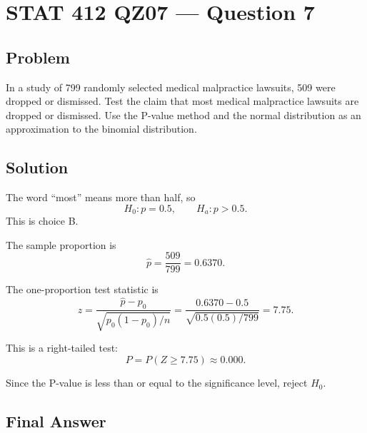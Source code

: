 \documentclass[11pt]{article}
\begin{document}
\section*{STAT 412 QZ07 --- Question 7}

\subsection*{Problem}

In a study of 799 randomly selected medical malpractice lawsuits, 509 were dropped or dismissed. Test the claim that most medical malpractice lawsuits are dropped or dismissed. Use the P-value method and the normal distribution as an approximation to the binomial distribution.

\subsection*{Solution}

The word ``most'' means more than half, so
\[
H_0:p=0.5,\qquad H_a:p>0.5.
\]
This is choice B.

The sample proportion is
\[
\widehat{p}=\frac{509}{799}=0.6370.
\]

The one-proportion test statistic is
\[
z=\frac{\widehat{p}-p_0}{\sqrt{p_0(1-p_0)/n}}
=\frac{0.6370-0.5}{\sqrt{0.5(0.5)/799}}
=7.75.
\]

This is a right-tailed test:
\[
P=P(Z\ge 7.75)\approx 0.000.
\]

Since the P-value is less than or equal to the significance level, reject $H_0$.

\subsection*{Final Answer}

\end{document}
